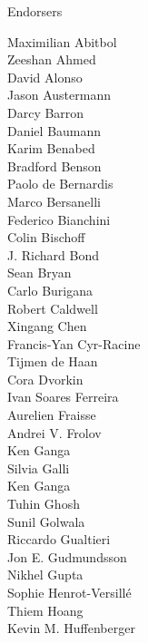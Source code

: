 \documentclass[PICOReport.tex]{subfiles}
\begin{document}
\Large { \centerline {Endorsers}}
%
\footnotesize {
\begin{multicols}{4}
Maximilian Abitbol              \\
Zeeshan Ahmed                   \\
David Alonso                    \\
Jason Austermann                \\
Darcy Barron                    \\
Daniel Baumann                  \\
Karim Benabed                   \\
Bradford Benson                 \\
Paolo de Bernardis              \\
Marco Bersanelli                \\
Federico Bianchini              \\
Colin Bischoff                  \\
J. Richard Bond                 \\
Sean Bryan                      \\
Carlo Burigana                  \\
Robert Caldwell                 \\
Xingang Chen                    \\
Francis-Yan Cyr-Racine          \\
Tijmen de Haan                  \\
Cora Dvorkin                    \\
Ivan Soares Ferreira            \\
Aurelien Fraisse                \\
Andrei V. Frolov                \\
Ken Ganga                       \\
Silvia Galli                    \\
Ken Ganga                       \\
Tuhin Ghosh                     \\
Sunil Golwala                   \\
Riccardo Gualtieri              \\
Jon E. Gudmundsson              \\
Nikhel Gupta                    \\
Sophie Henrot-Versill\'e        \\
Thiem Hoang                     \\
Kevin M. Huffenberger           \\

\end{multicols}}
\end{document}
